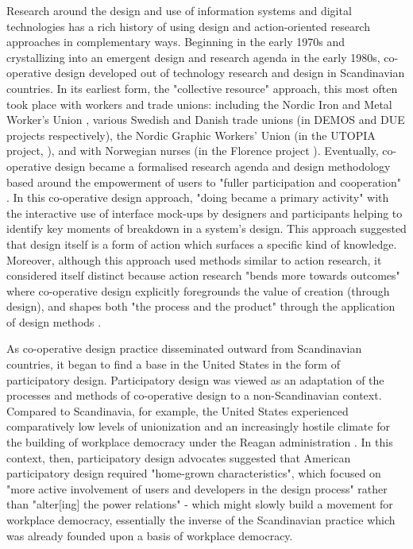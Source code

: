 Research around the design and use of information systems and digital technologies has a rich history of using design and action-oriented research approaches in complementary ways. Beginning in the early 1970s and crystallizing into an emergent design and research agenda in the early 1980s, co-operative design developed out of technology research and design in Scandinavian countries. In its earliest form, the "collective resource" approach, this most often took place with workers and trade unions: including the Nordic Iron and Metal Worker's Union \citep{nygaard_iron_1979}, various Swedish and Danish trade unions (in DEMOS and DUE projects respectively),  the Nordic Graphic Workers' Union (in the UTOPIA project, \citep{ehn_collective_1987, sundblad_utopia_2011}), and with Norwegian nurses (in the Florence project \citep{bjerknes_user_1995}). Eventually, co-operative design became a formalised research agenda and design methodology based around the empowerment of users to "fuller participation and cooperation" \citep{kyng_setting_1991}. In this co-operative design approach, "doing became a primary activity" with the interactive use of interface mock-ups by designers and participants helping to identify key moments of breakdown in a system's design. This approach suggested that design itself is a form of action which surfaces a specific kind of knowledge. Moreover, although this approach used methods similar to action research, it considered itself distinct because action research "bends more towards outcomes" where co-operative design explicitly foregrounds the value of creation (through design), and shapes both "the process and the product" through the application of design methods \citep{greenbaum_design_1993}.

As co-operative design practice disseminated outward from Scandinavian countries, it began to find a base in the United States in the form of participatory design. Participatory design was viewed as an adaptation of the processes and methods of co-operative design to a non-Scandinavian context. Compared to Scandinavia, for example, the United States experienced comparatively low levels of unionization and an increasingly hostile climate for the building of workplace democracy under the Reagan administration \citep{greenbaum_design_1993}. In this context, then, participatory design advocates suggested that American participatory design required "home-grown characteristics", which focused on "more active involvement of users and developers in the design process" rather than "alter[ing] the power relations" - which might slowly build a movement for workplace democracy, essentially the inverse of the Scandinavian practice which was already founded upon a basis of workplace democracy.

